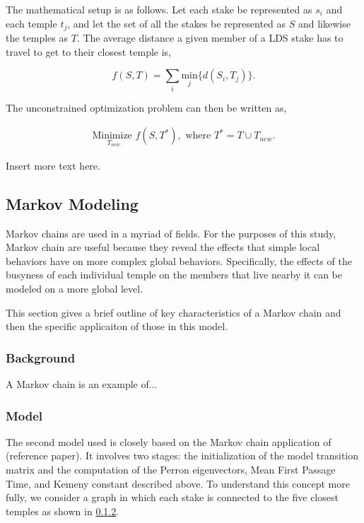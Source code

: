 \documentclass[twoside,twocolumn]{article}
\begin{document}
The mathematical setup is as follows. Let each stake be represented as $s_i$ and each temple $t_j$, and let the set of all the stakes be represented as $S$ and likewise the temples as $T$. The average distance a given member of a LDS stake has to travel to get to their closest temple is, 

\begin{equation}
	f(S,T) = \sum_i \underset{j}{\text{min}}\{d(S_i,T_j)\}.
\end{equation}

The unconstrained optimization problem can then be written as,

\begin{equation}
\begin{aligned}
	\underset{T_{new}}{\text{Minimize }} f(S,T^*), \text{ where } T^* = T \cup T_{new}.
\end{aligned}
\end{equation}

Insert more text here.


\subsection{Markov Modeling}

Markov chains are used in a myriad of fields. For the purposes of this study, Markov chain are useful because they reveal the effects that simple local behaviors have on more complex global behaviors. Specifically, the effects of the busyness of each individual temple on the members that live nearby it can be modeled on a more global level.

This section gives a brief outline of key characteristics of a Markov chain and then the specific applicaiton of those in this model.

\subsubsection{Background}

A Markov chain is an example of...

\subsubsection{Model}
The second model used is closely based on the Markov chain application of (reference paper). It involves two stages: the initialization of the model transition matrix and the computation of the Perron eigenvectors, Mean First Passage Time, and Kemeny constant described above. To understand this concept more fully, we consider a graph in which each stake is connected to the five closest temples as shown in \ref{}.
\end{document}
